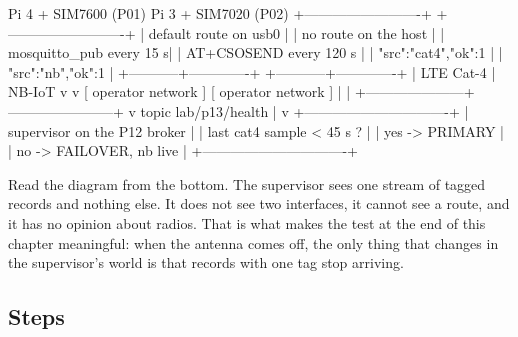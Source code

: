 \begin{asciiart}
  Pi 4 + SIM7600 (P01)                          Pi 3 + SIM7020 (P02)
  +-------------------------+                   +-------------------------+
  | default route on usb0   |                   | no route on the host    |
  | mosquitto_pub every 15 s|                   | AT+CSOSEND every 120 s  |
  |   {"src":"cat4","ok":1} |                   |   {"src":"nb","ok":1}   |
  +-----------+-------------+                   +-----------+-------------+
              |  LTE Cat-4                                  |  NB-IoT
              v                                             v
      [ operator network ]                          [ operator network ]
              |                                             |
              +---------------------+-----------------------+
                                    v
                        topic  lab/p13/health
                                    |
                                    v
                    +-------------------------------+
                    | supervisor on the P12 broker  |
                    |   last cat4 sample < 45 s ?   |
                    |     yes -> PRIMARY            |
                    |     no  -> FAILOVER, nb live  |
                    +-------------------------------+
\end{asciiart}

Read the diagram from the bottom. The supervisor sees one stream of tagged records and nothing else. It does not see two interfaces, it cannot see a route, and it has no opinion about radios. That is what makes the test at the end of this chapter meaningful: when the antenna comes off, the only thing that changes in the supervisor's world is that records with one tag stop arriving.

\subsection*{Steps}

